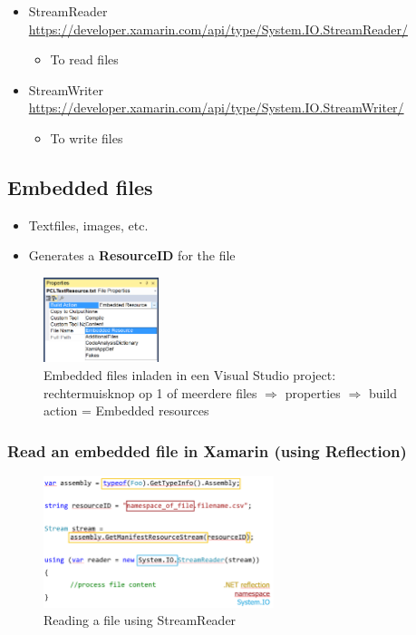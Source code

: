 \documentclass{article}
\newcommand{\bold}[1]{\textbf{#1}}
\begin{document}
\begin{itemize}
    \item StreamReader \url{https://developer.xamarin.com/api/type/System.IO.StreamReader/}
    \begin{itemize}
        \item To read files 
    \end{itemize}
    \item StreamWriter \url{https://developer.xamarin.com/api/type/System.IO.StreamWriter/}
    \begin{itemize}
        \item To write files 
    \end{itemize}
\end{itemize}

\subsection{Embedded files}

\begin{itemize}
    \item Textfiles, images, etc.
    \item Generates a \bold{ResourceID} for the file
\end{itemize}

\begin{figure}[H]
    \centering
    \includegraphics[width=0.3\textwidth]{embedded-files0.png}
    \caption{Embedded files inladen in een Visual Studio project: rechtermuisknop op 1 of meerdere files $\Rightarrow$ properties $\Rightarrow$ build action = Embedded resources}
\end{figure}

\subsubsection{Read an embedded file in Xamarin (using Reflection)}

\begin{figure}[H]
    \centering
    \includegraphics[width=0.6\textwidth]{embedded-files.png}
    \caption{Reading a file using StreamReader}
\end{figure}
\end{document}
